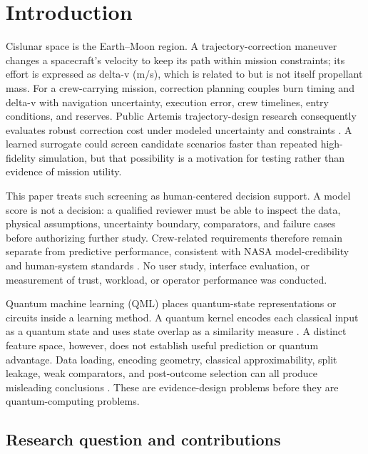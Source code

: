 \section{Introduction}

Cislunar space is the Earth--Moon region. A trajectory-correction maneuver
changes a spacecraft's velocity to keep its path within mission constraints;
its effort is expressed as delta-v (m/s), which is related to but is not itself
propellant mass. For a crew-carrying mission, correction planning couples burn
timing and delta-v with navigation uncertainty, execution error, crew
timelines, entry conditions, and reserves. Public Artemis trajectory-design
research consequently evaluates robust correction cost under modeled
uncertainty and constraints \cite{woffinden2023}. A learned surrogate could
screen candidate scenarios faster than repeated high-fidelity simulation, but
that possibility is a motivation for testing rather than evidence of mission
utility.

This paper treats such screening as human-centered decision support. A model
score is not a decision: a qualified reviewer must be able to inspect the data,
physical assumptions, uncertainty boundary, comparators, and failure cases
before authorizing further study. Crew-related requirements therefore remain
separate from predictive performance, consistent with NASA model-credibility
and human-system standards \cite{nasa7009,nasa3001}. No user study, interface
evaluation, or measurement of trust, workload, or operator performance was
conducted.

Quantum machine learning (QML) places quantum-state representations or
circuits inside a learning method. A quantum kernel encodes each classical
input as a quantum state and uses state overlap as a similarity measure
\cite{schuld2019,havlicek2019}. A distinct feature space, however, does not
establish useful prediction or quantum advantage. Data loading, encoding
geometry, classical approximability, split leakage, weak comparators, and
post-outcome selection can all produce misleading conclusions
\cite{huang2021,sweke2025,bowles2024,schnabel2024}. These are evidence-design
problems before they are quantum-computing problems.

\subsection{Research question and contributions}

